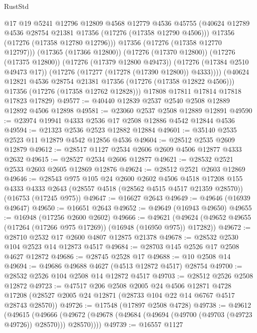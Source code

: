 \begin{lexlean}{RustStd}
\begin{coremodule}
                @17
                @19
                @5241
                @12796
                @12809
                @4568
                @12779
                @4536
                @45755
                (@40624 @12789 @4536 @28754 @21381 @17356 (@17276 (@17358 @12790 @4506)))
                @17356
                (@17276 (@17358 @12780 @12796)))
              @17356
              (@17276 (@17358 @12770 @12797)))
            (@17365 (@17366 @12800))
            (@17276 (@17370 @12800))
            (@17276 (@17375 @12800))
            (@17276 (@17379 @12800 @49473))
            (@17276 (@17384 @2510 @49473 @17))
            (@17276 (@17277 (@17278 (@17390 @12800)) @4333))))
        (@40624 @12821 @4536 @28754 @21381 @17356 (@17276 (@17358 @12822 @4506)))
        @17356
        (@17276 (@17358 @12762 @12828)))
      @17808
      @17811
      @17814
      @17818
      @17823
      @17829)
@49577 := @40440 @12839 @2537 @2540 @2508 @12889 @12892 @4506 @12898
@49581 := @23060 @2537 @2508 @12889 @12891
@49590 := @23974 @19941 @4333 @2536 @17 @2508 @12886 @4542 @12844 @4536
@49594 := @21323 @2536 @2523 @12882 @12884
@49601 := @35140 @2535 @2523 @11 @12879 @4542 @12856 @4536
@49604 := @28512 @2535 @2609 @12879
@49612 := @28517 @1127 @2534 @2606 @2609 @4506 @12877 @4333 @2632
@49615 := @28527 @2534 @2606 @12877
@49621 := @28532 @2521 @2533 @2603 @2605 @12869 @12876
@49624 := @28512 @2521 @2603 @12869
@49646 := @28543
    @975
    @105
    @24
    @2600
    @2602
    @4506
    @4518
    @17208
    @155
    @4333
    @4333
    @2643
    (@28557 @4518 (@28562 @4515 @4517 @21359 @28570))
    (@16753 (@17245 @975))
@49647 := @16627 @2643
@49649 := @49646 (@16939 @49647)
@49650 := @16651 @2643
@49652 := @49649 (@16943 @49650)
@49655 := @16948 (@17256 @2600 @2602)
@49666 := @49621
    (@49624 (@49652 @49655 (@17264 (@17266 @975 @17269)) (@16948 (@16950 @975)) @17282))
@49672 := @28710 @2532 @17 @2600 @4807 @12875 @21378
@49678 := @28532 @2530 @104 @2523 @14 @12873 @4517
@49684 := @28703 @145 @2526 @17 @2508 @4627 @12872
@49686 := @28745 @2528 @17
@49688 := @10 @2508 @14
@49694 := @49686 @49688 @4627 (@4513 @12872 @4517) @28754
@49700 := @28532 @2526 @104 @2508 @14 @12872 @4517
@49703 := @28512 @2526 @2508 @12872
@49723 := @47517
    @206
    @2508
    @2005
    @24
    @4506
    @12871
    @4728
    @17208
    (@28527 @2005 @24 @12871 (@28733 @104 @22 @14 @6767 @4517 @28743 @28570))
@49726 := @17548 (@17897 @2508 @4728)
@49738 := @49612
    (@49615
      (@49666 (@49672 (@49678 (@49684 (@49694 (@49700 (@49703 (@49723 @49726)) @28570))) @28570))))
@49739 := @16557 @1127

\end{coremodule}
\end{lexlean}
